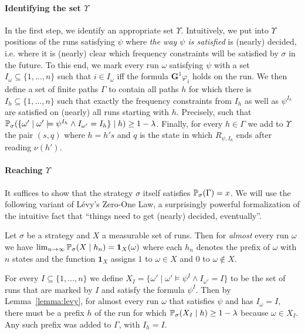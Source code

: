 \documentclass[a4paper,UKenglish]{lipics}
\newcommand{\Gf}[1]{\mathbf{G}^{#1}}
\newcommand{\idf}{\mathbf{1}}
\renewcommand{\Pr}[3][]{\ifblank{#1}{\mathbb{P}_{#2}}{\mathbb{P}^{#1}_{#2}}(#3)}
\newcommand{\rabin}{R}
\begin{document}
\paragraph*{Identifying the set $\Upsilon$}\label{page:sqI}

In the first step, we identify an appropriate set $\Upsilon$.
Intuitively, we put into $\Upsilon$ positions of the runs satisfying $\psi$ where \emph{the way $\psi$ is satisfied} is (nearly) decided, i.e. where it is (nearly) clear which frequency constraints will be satisfied by $\sigma$ in the future.
To this end, we mark every run $\omega$ satisfying $\psi$ with a set $I_\omega \subseteq \{1,\ldots,n\}$ such that $i\in I_\omega$ iff the formula
$\Gf{1} \varphi_i$ holds on the run. We then define a set of finite paths $\Gamma$ to contain all paths
$h$ for which there is $I_h \subseteq \{1,\ldots,n\}$ such that exactly the frequency constraints from $I_h$ as well as $\psi^{I_h}$ are satisfied on (nearly) all runs starting with $h$. Precisely, such that
$\Pr{\sigma}{\{\omega' \mid \omega' \models \psi^{I_h} \land I_{\omega'} = I_h\} \mid h} \ge 1-\lambda$.
Finally, for every $h \in \Gamma$ we add to $\Upsilon$ the pair $(s,q)$ where $h = h' s$ and $q$ is the state in which $\rabin_{\psi,I_h}$ ends after reading $\nu(h')$.



\paragraph*{Reaching $\Upsilon$}

It suffices to show that the strategy $\sigma$ itself satisfies $\Pr{\sigma}{\Gamma} = x$. We will use the following variant of L\'evy's Zero-One Law, a surprisingly powerful formalization of the intuitive fact that ``things need to get (nearly) decided, eventually''.

\begin{lemma}\label{lemma:levy}
	Let $\sigma$ be a strategy and $X$ a measurable set of runs. Then for \emph{almost} every run $\omega$ we have
	$\lim_{n\to\infty} \Pr{\sigma}{X \mid h_n} = \idf_X(\omega)$
	where each $h_n$ denotes the prefix of $\omega$ with $n$ states and the function $\idf_X$ assigns $1$ to $\omega \in X$ and $0$ to $\omega \not\in X$.
\end{lemma}
\noindent
For every $I \subseteq \{1,\ldots,n\}$ we define $X_I = \{ \omega' \mid \omega' \models \psi^{I} \land I_{\omega'} = I \}$ to be the set of runs that are marked by $I$ and satisfy the formula $\psi^I$. 
Then by Lemma~\ref{lemma:levy}, for almost every run $\omega$ that satisfies $\psi$ and has $I_\omega = I$, there must be a prefix $h$ of the run for which $\Pr{\sigma}{ X_I \mid h} \geq 1-\lambda$ because $\omega \in X_I$. Any such prefix was added to $\Gamma$, with $I_h = I$.
\end{document}
